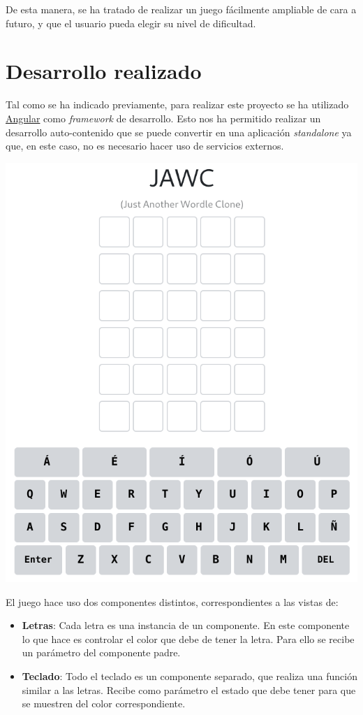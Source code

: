 \documentclass{\ClassPath/viu-tfm-template}
\begin{document}
De esta manera, se ha tratado de realizar un juego fácilmente ampliable de cara a futuro, y que el usuario pueda elegir su nivel de dificultad.


\chapter{Desarrollo realizado}
Tal como se ha indicado previamente, para realizar este proyecto se ha utilizado \href{https://angular.io/}{Angular} como \textit{framework} de desarrollo. Esto nos ha permitido realizar un desarrollo auto-contenido que se puede convertir en una aplicación \textit{standalone} ya que, en este caso, no es necesario hacer uso de servicios externos.


\begin{center}
    \includegraphics[frame,width=0.7\linewidth]{img/inicio.png}
\end{center}

El juego hace uso dos componentes distintos, correspondientes a las vistas de:

\vspace{-1em}
\begin{itemize}
    \item \textbf{Letras}: Cada letra es una instancia de un componente. En este componente lo que hace es controlar el color que debe de tener la letra. Para ello se recibe un parámetro del componente padre.
    \item \textbf{Teclado}: Todo el teclado es un componente separado, que realiza una función similar a las letras. Recibe como parámetro el estado que debe tener para que se muestren del color correspondiente.
\end{itemize}
\vspace{-1em}
\end{document}
